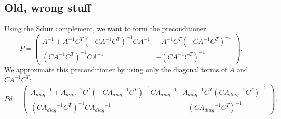 \documentclass{article}[10pt]
\newcommand{\Adiag}{\ensuremath{A_\mathit{diag}}}
\begin{document}
\subsection*{Old, wrong stuff}

Using the Schur complement, we want to form the preconditioner
\begin{equation}
  P = \left( \begin{array}{cc}
    A^{-1} + A^{-1} C^T (-C A^{-1} C^T)^{-1} C A^{-1} &
    -A^{-1} C^T (-C A^{-1} C^T)^{-1} \\
    (C A^{-1} C^T)^{-1} C A^{-1} & -(C A^{-1} C^T)^{-1}
  \end{array} \right).
\end{equation}
We approximate this preconditioner by using only the diagonal terms of $A$ and $C A^{-1} C^T$:
\begin{equation}
  Pd = \left( \begin{array}{cc}
    \Adiag^{-1} + \Adiag^{-1} C^T (-C \Adiag^{-1} C^T)^{-1} C \Adiag^{-1} &
    \Adiag^{-1} C^T (C \Adiag^{-1} C^T)^{-1} \\
    (C \Adiag^{-1} C^T)^{-1} C \Adiag^{-1} & -(C \Adiag^{-1} C^T)^{-1}
  \end{array} \right).
\end{equation}


\end{document}
